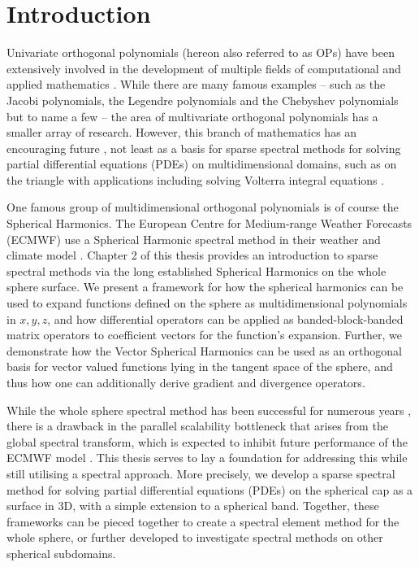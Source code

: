 
\chapter{Introduction}

Univariate orthogonal polynomials (hereon also referred to as OPs) have been extensively involved in the development of multiple fields of computational and applied mathematics \cite{onedimopsrefs}. While there are many famous examples -- such as the Jacobi polynomials, the Legendre polynomials and the Chebyshev polynomials but to name a few -- the area of multivariate orthogonal polynomials has a smaller array of research. However, this branch of mathematics has an encouraging future \cite{dunkl2014orthogonal}, not least as a basis for sparse spectral methods for solving partial differential equations (PDEs) on multidimensional domains, such as on the triangle \cite{olver2019triangle} with applications including solving Volterra integral equations \cite{gutleb2020sparse}.

One famous group of multidimensional orthogonal polynomials is of course the Spherical Harmonics. The European Centre for Medium-range Weather Forecasts (ECMWF) use a Spherical Harmonic spectral method in their weather and climate model \cite{cheong2006dynamical}. Chapter 2 of this thesis provides an introduction to sparse spectral methods via the long established Spherical Harmonics on the whole sphere surface. We present a framework for how the spherical harmonics can be used to expand functions defined on the sphere as multidimensional polynomials in $x, y, z$, and how differential operators can be applied as banded-block-banded matrix operators to coefficient vectors for the function's expansion. Further, we demonstrate how the Vector Spherical Harmonics can be used as an orthogonal basis for vector valued functions lying in the tangent space of the sphere, and thus how one can additionally derive gradient and divergence operators.

While the whole sphere spectral method has been successful for numerous years \cite{wedi2013fast}, there is a drawback in the parallel scalability bottleneck that arises from the global spectral transform, which is expected to inhibit future performance of the ECMWF model \cite{ecmwf2020scalability}. This thesis serves to lay a foundation for addressing this while still utilising a spectral approach. More precisely, we develop a sparse spectral method for solving partial differential equations (PDEs) on the spherical cap as a surface in 3D, with a simple extension to a spherical band. Together, these frameworks can be pieced together to create a spectral element method for the whole sphere, or further developed to investigate spectral methods on other spherical subdomains.

